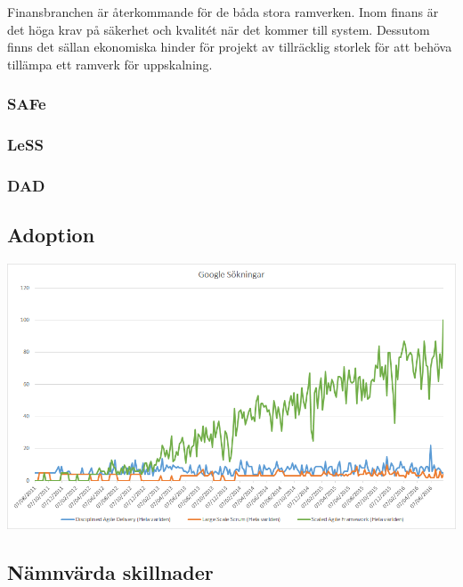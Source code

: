 		
		Finansbranchen är återkommande för de båda stora ramverken. Inom finans är det höga krav på säkerhet och kvalitét när det kommer till system. Dessutom finns det sällan ekonomiska hinder för projekt av tillräcklig storlek för att behöva tillämpa ett ramverk för uppskalning. 
		
		
	
	
		
	
	\subsubsection{SAFe}	
		
	\subsubsection{LeSS}
		
	\subsubsection{DAD}
	
	\subsection{Adoption}
	
		\begin{center}
			\includegraphics{Grafer/Google_sokningar.png}
		\end{center}
	\cite{google_stats}
	
		
	\subsection{Nämnvärda skillnader}